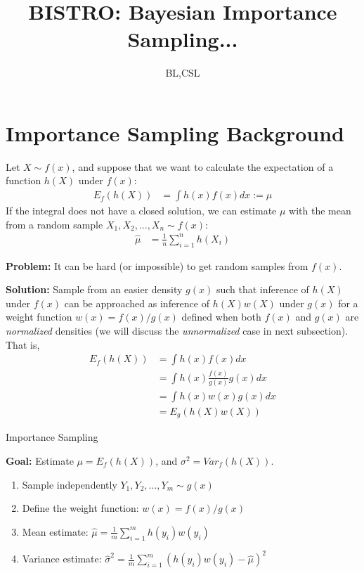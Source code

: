 \documentclass[conference]{IEEEtran}
\begin{document}
\title{BISTRO: Bayesian Importance Sampling...}
\author{BL,CSL}
\maketitle


\section{Importance Sampling Background}
\label{background}

Let $X \sim f(x)$, and suppose that we want to calculate the
expectation of a function $h(X)$ under $f(x)$:
\begin{align*}
E_f(h(X)) &= \int h(x) f(x) dx := \mu
\end{align*}
If the integral does not have a closed solution, we can estimate $\mu$
with the mean from a random sample $X_1,X_2,...,X_n \sim f(x)$:
\begin{align*}
\hat{\mu} &= \frac{1}{n} \sum_{i=1}^n h(X_i)
\end{align*}

\textbf{Problem:} It can be hard (or impossible) to get random samples
from $f(x)$.


\textbf{Solution:} Sample from an easier density $g(x)$ such that inference of $h(X)$ under $f(x)$ can be approached as
inference of $h(X)w(X)$ under $g(x)$ for a weight function
$w(x)=f(x)/g(x)$ defined when both $f(x)$ and $g(x)$ are \textit{normalized} densities (we will discuss the
    \textit{unnormalized} case in next subsection). That is,
\begin{align*}
E_f(h(X)) &= \int h(x) f(x) dx \\
&= \int h(x) \frac{f(x)}{g(x)} g(x) dx \\
&= \int h(x) w(x) g(x) dx \\
&= E_g(h(X)w(X))
\end{align*}

\begin{algorithm}
\caption{Importance Sampling}
\textbf{Goal:} Estimate $\mu = E_f(h(X))$, and $\sigma^2 = Var_f(h(X))$.
\begin{enumerate}
\item{Sample independently $Y_1,Y_2,...,Y_m \sim g(x)$}
\item{Define the weight function: $w(x) = f(x)/g(x)$}
\item{Mean estimate: $\hat{\mu} = \frac{1}{m} \sum_{i=1}^m
    h(y_i)w(y_i)$}
\item{Variance estimate: $\hat{\sigma}^2 = \frac{1}{m} \sum_{i=1}^m
    (h(y_i)w(y_i) - \hat{\mu})^2$}
\end{enumerate}
\end{algorithm}
\end{document}
